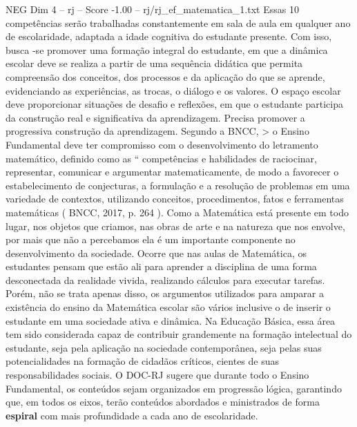 \begin{textsample}{NEG Dim 4 – rj – Score -1.00 – rj/rj\_ef\_matematica\_1.txt}
Essas 10 competências serão trabalhadas constantemente em sala de aula em qualquer ano de escolaridade, adaptada a idade cognitiva do estudante presente.
Com isso, busca -se promover uma formação integral do estudante, em que a dinâmica escolar deve se realiza a partir de uma sequência didática que permita compreensão dos conceitos, dos processos e da aplicação do que se aprende, evidenciando as experiências, as trocas, o diálogo e os valores.
O espaço escolar deve proporcionar situações de desafio e reflexões, em que o estudante participa da construção real e significativa da aprendizagem.
Precisa promover a progressiva construção da aprendizagem.
Segundo a BNCC, > o Ensino Fundamental deve ter compromisso com o desenvolvimento do letramento matemático, definido como as “ competências e habilidades de raciocinar, representar, comunicar e argumentar matematicamente, de modo a favorecer o estabelecimento de conjecturas, a formulação e a resolução de problemas em uma variedade de contextos, utilizando conceitos, procedimentos, fatos e ferramentas matemáticas ( BNCC, 2017, p. 264 ).
Como a Matemática está presente em todo lugar, nos objetos que criamos, nas obras de arte e na natureza que nos envolve, por mais que não a percebamos ela é um importante componente no desenvolvimento da sociedade.
Ocorre que nas aulas de Matemática, os estudantes pensam que estão ali para aprender a disciplina de uma forma desconectada da realidade vivida, realizando cálculos para executar tarefas.
Porém, não se trata apenas disso, os argumentos utilizados para amparar a existência do ensino da Matemática escolar são vários inclusive o de inserir o estudante em uma sociedade ativa e dinâmica.
Na Educação Básica, essa área tem sido considerada capaz de contribuir grandemente na formação intelectual do estudante, seja pela aplicação na sociedade contemporânea, seja pelas suas potencialidades na formação de cidadãos críticos, cientes de suas responsabilidades sociais.
O DOC-RJ sugere que durante todo o Ensino Fundamental, os conteúdos sejam organizados em progressão lógica, garantindo que, em todos os eixos, terão conteúdos abordados e ministrados de forma \textbf{espiral} com mais profundidade a cada ano de escolaridade.

\end{textsample}
